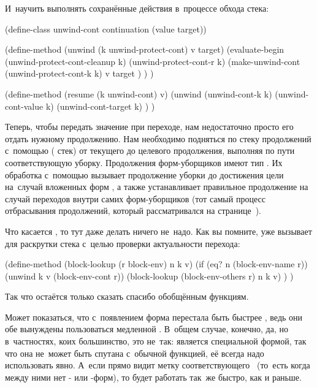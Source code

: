 \noindent
И~научить  выполнять сохранённые действия в~процессе обхода стека:

\begin{code:lisp}
(define-class unwind-cont continuation (value target))

(define-method (unwind (k unwind-protect-cont) v target)
  (evaluate-begin (unwind-protect-cont-cleanup k)
                  (unwind-protect-cont-r k)
                  (make-unwind-cont
                   (unwind-protect-cont-k k) v target ) ) )

(define-method (resume (k unwind-cont) v)
  (unwind (unwind-cont-k k)
          (unwind-cont-value k)
          (unwind-cont-target k) ) )
\end{code:lisp}

Теперь, чтобы передать значение при переходе, нам недостаточно просто его отдать
нужному продолжению. Нам необходимо подняться по стеку продолжений с~помощью
 ( стек) от текущего до целевого продолжения,
выполняя по пути соответствующую уборку. Продолжения форм-уборщиков имеют тип
. Их обработка с~помощью  вызывает продолжение уборки
до достижения цели на~случай вложенных форм , а также
устанавливает правильное продолжение на случай переходов внутри самих
форм-уборщиков (тот самый процесс отбрасывания продолжений, который
рассматривался на странице~\pageref{escape/forms/protection/p:discard}).

Что касается , то тут даже делать ничего не~надо. Как вы помните,
 уже вызывает  для раскрутки стека с~целью проверки
актуальности перехода:

\begin{code:lisp}
(define-method (block-lookup (r block-env) n k v)
  (if (eq? n (block-env-name r))
      (unwind k v (block-env-cont r))
      (block-lookup (block-env-others r) n k v) ) )
\end{code:lisp}

\noindent
Так что остаётся только сказать спасибо обобщённым функциям.

Может показаться, что с~появлением  форма 
перестала быть быстрее , ведь они обе вынуждены пользоваться медленной
. В~общем случае, конечно, да, но в~частностях, коих большинство, это
не~так:  является специальной формой, так что она не~может
быть спутана с~обычной функцией, её всегда надо использовать явно. А~если
 прямо видит метку соответствующего~ (то~есть когда
между ними нет - или -форм), то  будет
работать так~же быстро, как и раньше.

